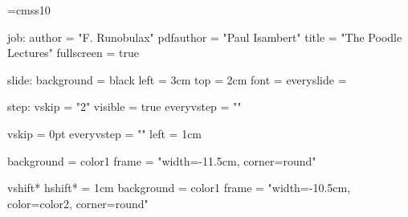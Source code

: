 %
% 
%




\font\mainfont=cmss10

\setparameter job:
  author    = "F. Runobulax"
  pdfauthor = "Paul Isambert"
  title     = "The Poodle Lectures"
  fullscreen = true

\setparameter slide:
  background = black
  left       = 3cm
  top        = 2cm
  font       = \mainfont
  everyslide = \everyslide

\def\everyslide{%
  \position{title}{\slidetitle}
  \position{author}{\Author}
  \step This is Step One.\par
    \substep High-school diploma.\par
    \substep Stuffed with a gym sock.\par
  \step This is Step Two.\par
    \substep College degree.\par
    \substep Stuffed with absolutely nothing at all.\par
  \step One more time for the world.
  }

\setparameter step:
  vskip      = "2\baselineskip"
  visible    = true
  everyvstep = "\quitvmode\llap{\stepsymbol\kern1em}"

\setstep\substep
  vskip      = 0pt
  everyvstep = "\quitvmode\llap{\substepsymbol\kern1em}"
  left       = 1cm






  background = color1
  frame      = "width=-11.5cm, corner=round"

  vshift* hshift* = 1cm
  background      = color1
  frame           = "width=-10.5cm, color=color2, corner=round"

 
\newsymbol{}
\newsymbol{}
  
\slide[Duke of Prunes, areas*= author title]

